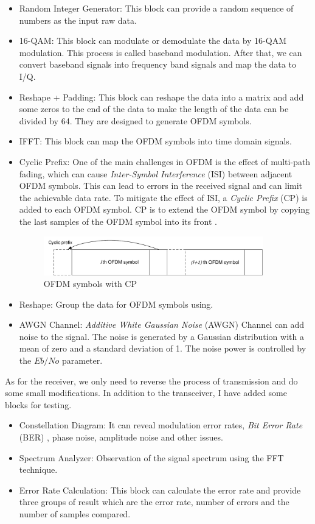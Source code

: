 \documentclass[11pt]{article}
\numberwithin{figure}{section}
\numberwithin{equation}{section}
\begin{document}
\begin{itemize}
    \item Random Integer Generator: This block can provide a random sequence of numbers as the input raw data.
    \item 16-QAM: This block can modulate or demodulate the data by 16-QAM modulation. This process is called baseband modulation. After that, we can convert baseband signals into frequency band signals and map the data to I/Q.
    \item Reshape + Padding: This block can reshape the data into a matrix and add some zeros to the end of the data to make the length of the data can be divided by 64. They are designed to generate OFDM symbols.
    \item IFFT: This block can map the OFDM symbols into time domain signals. 
    \item Cyclic Prefix: One of the main challenges in OFDM is the effect of multi-path fading, which can cause \textit{Inter-Symbol Interference} (ISI) between adjacent OFDM symbols. This can lead to errors in the received signal and can limit the achievable data rate. To mitigate the effect of ISI, a \textit{Cyclic Prefix} (CP) is added to each OFDM symbol. CP is to extend the OFDM symbol by copying the last samples of the OFDM symbol into its front \cite{RN146}.
    \begin{figure}[!ht]
        \centering
        \includegraphics[width=0.9\textwidth]{images/Cyclic prefix.pdf}
        \caption{OFDM symbols with CP}
        \label{fig:CP}
    \end{figure}
    \item Reshape: Group the data for OFDM symbols using.
    \item AWGN Channel: \textit{Additive White Gaussian Noise} (AWGN) Channel can add noise to the signal. The noise is generated by a Gaussian distribution with a mean of zero and a standard deviation of 1. The noise power is controlled by the $Eb/No$ parameter.
\end{itemize}
As for the receiver, we only need to reverse the process of transmission and do some small modifications. In addition to the transceiver, I have added some blocks for testing.
\begin{itemize}
    \item Constellation Diagram: It can reveal modulation error rates, \textit{Bit Error Rate} (BER) , phase noise, amplitude noise and other issues.
    \item Spectrum Analyzer: Observation of the signal spectrum using the FFT technique.
    \item Error Rate Calculation: This block can calculate the error rate and provide three groups of result which are the error rate, number of errors and the number of samples compared.
\end{itemize}
\end{document}

